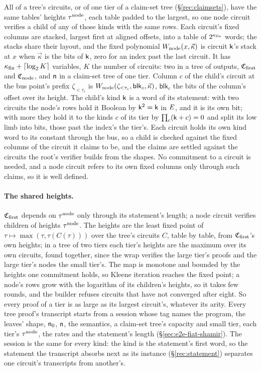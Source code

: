 All of a tree's circuits, or of one tier of a claim-set tree (\S\ref{rec:claimsets}), have the same tables' heights $\tau^{\mathrm{node}}$, each table padded to the largest, so one node circuit verifies a child of any of those kinds with the same rows. Each circuit's fixed columns are stacked, largest first at aligned offsets, into a table of $2^{\kappa_{\mathrm{fix}}}$ words; the stacks share their layout, and the fixed polynomial $W_{\mathrm{node}}(x,\vec\kappa)$ is circuit $\mathsf{k}$'s stack at $x$ when $\vec\kappa$ is the bits of $\mathsf{k}$, zero for an index past the last circuit. It has $\kappa_{\mathrm{fix}}+\lceil\log_2 K\rceil$ variables, $K$ the number of circuits: two in a tree of outputs, $\mathfrak{C}_{\mathrm{first}}$ and $\mathfrak{C}_{\mathrm{node}}$, and $\mathsf{n}$ in a claim-set tree of one tier. Column $c$ of the child's circuit at the bus point's prefix $\zeta_{<\tau_c}$ is $W_{\mathrm{node}}(\zeta_{<\tau_c},\mathsf{blk}_c,\vec\kappa)$, $\mathsf{blk}_c$ the bits of the column's offset over its height. The child's kind $\mathsf{k}$ is a word of its statement: with two circuits the node's rows hold it Boolean by $\mathsf{k}^2=\mathsf{k}$ in $E$, and it is its own bit; with more they hold it to the kinds $c$ of its tier by $\prod_c(\mathsf{k}+c)=0$ and split its low limb into bits, those past the index's the tier's. Each circuit holds its own kind word to its constant through the bus, so a child is checked against the fixed columns of the circuit it claims to be, and the claims are settled against the circuits the root's verifier builds from the shapes. No commitment to a circuit is needed, and a node circuit refers to its own fixed columns only through such claims, so it is well defined.

\paragraph{The shared heights.} $\mathfrak{C}_{\mathrm{first}}$ depends on $\tau^{\mathrm{node}}$ only through its statement's length; a node circuit verifies children of heights $\tau^{\mathrm{node}}$. The heights are the least fixed point of $\tau\mapsto\max(\tau,\tau(C(\tau)))$ over the tree's circuits $C$, table by table, from $\mathfrak{C}_{\mathrm{first}}$'s own heights; in a tree of two tiers each tier's heights are the maximum over its own circuits, found together, since the wrap verifies the large tier's proofs and the large tier's nodes the small tier's. The map is monotone and bounded by the heights one commitment holds, so Kleene iteration reaches the fixed point; a node's rows grow with the logarithm of its children's heights, so it takes few rounds, and the builder refuses circuits that have not converged after eight. So every proof of a tier is as large as its largest circuit's, whatever its arity. Every tree proof's transcript starts from a session whose tag names the program, the leaves' shape, $\mathsf{n}_0$, $\mathsf{n}$, the semantics, a claim-set tree's capacity and small tier, each tier's $\tau^{\mathrm{node}}$, the rates and the statement's length (\S\ref{sec:e2e-fiat-shamir}). The session is the same for every kind: the kind is the statement's first word, so the statement the transcript absorbs next as its instance (\S\ref{rec:statement}) separates one circuit's transcripts from another's.

